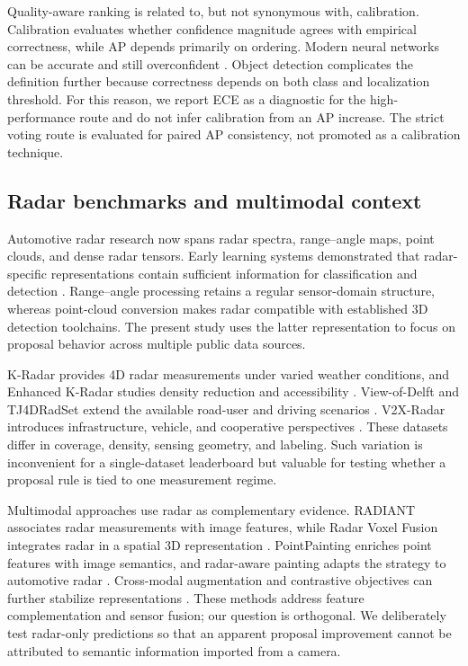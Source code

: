 \documentclass[final,5p,times]{elsarticle}
\begin{document}
Quality-aware ranking is related to, but not synonymous with, calibration.
Calibration evaluates whether confidence magnitude agrees with empirical
correctness, while AP depends primarily on ordering. Modern neural networks
can be accurate and still overconfident \cite{guo2017calibration}. Object
detection complicates the definition further because correctness depends on
both class and localization threshold. For this reason, we report ECE as a
diagnostic for the high-performance route and do not infer calibration from an
AP increase. The strict voting route is evaluated for paired AP consistency,
not promoted as a calibration technique.

\subsection{Radar benchmarks and multimodal context}

Automotive radar research now spans radar spectra, range--angle maps, point
clouds, and dense radar tensors. Early learning systems demonstrated that
radar-specific representations contain sufficient information for
classification and detection \cite{patel2019radarspectra,wang2021rodnet}.
Range--angle processing retains a regular sensor-domain structure, whereas
point-cloud conversion makes radar compatible with established 3D detection
toolchains. The present study uses the latter representation to focus on
proposal behavior across multiple public data sources.

K-Radar provides 4D radar measurements under varied weather conditions, and
Enhanced K-Radar studies density reduction and accessibility
\cite{paek2022kradar,paek2023enhancedkradar}. View-of-Delft and TJ4DRadSet
extend the available road-user and driving scenarios
\cite{palffy2022viewofdelft,zheng2022tj4dradset}. V2X-Radar introduces
infrastructure, vehicle, and cooperative perspectives
\cite{yang2024v2xradar}. These datasets differ in coverage, density, sensing
geometry, and labeling. Such variation is inconvenient for a single-dataset
leaderboard but valuable for testing whether a proposal rule is tied to one
measurement regime.

Multimodal approaches use radar as complementary evidence. RADIANT associates
radar measurements with image features, while Radar Voxel Fusion integrates
radar in a spatial 3D representation
\cite{long2023radiant,nobis2021radarvoxelfusion}. PointPainting enriches point
features with image semantics, and radar-aware painting adapts the strategy to
automotive radar \cite{vora2020pointpainting,montiel2024pointcloudpainting}.
Cross-modal augmentation and contrastive objectives can further stabilize
representations \cite{deng2024crossmodal,zhang2024contrastiveradar}. These
methods address feature complementation and sensor fusion; our question is
orthogonal. We deliberately test radar-only predictions so that an apparent
proposal improvement cannot be attributed to semantic information imported
from a camera.
\end{document}
